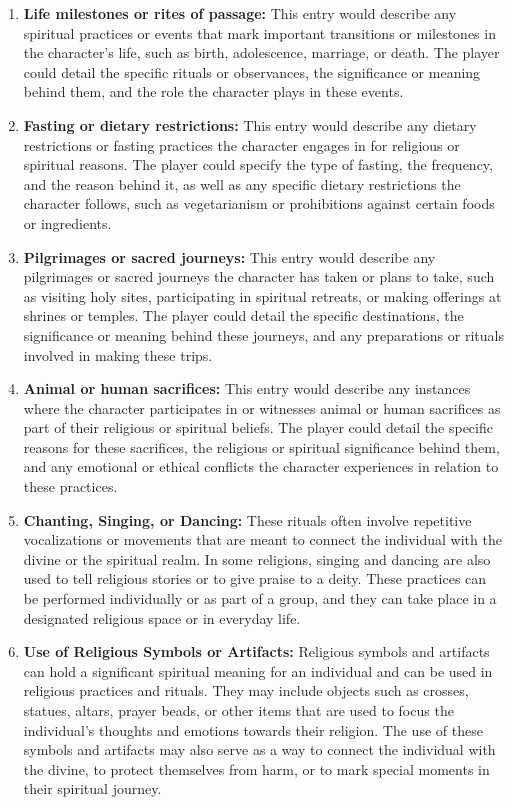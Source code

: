 \documentclass[12pt]{book}
\begin{document}
\begin{enumerate}
    \item \textbf{Life milestones or rites of passage:}
    This entry would describe any spiritual practices or events that mark important transitions or milestones in the character's life, such as birth, adolescence, marriage, or death. The player could detail the specific rituals or observances, the significance or meaning behind them, and the role the character plays in these events.

    \item \textbf{Fasting or dietary restrictions:}
    This entry would describe any dietary restrictions or fasting practices the character engages in for religious or spiritual reasons. The player could specify the type of fasting, the frequency, and the reason behind it, as well as any specific dietary restrictions the character follows, such as vegetarianism or prohibitions against certain foods or ingredients.
    
    \item \textbf{Pilgrimages or sacred journeys:}
    This entry would describe any pilgrimages or sacred journeys the character has taken or plans to take, such as visiting holy sites, participating in spiritual retreats, or making offerings at shrines or temples. The player could detail the specific destinations, the significance or meaning behind these journeys, and any preparations or rituals involved in making these trips.

    \item \textbf{Animal or human sacrifices:}
    This entry would describe any instances where the character participates in or witnesses animal or human sacrifices as part of their religious or spiritual beliefs. The player could detail the specific reasons for these sacrifices, the religious or spiritual significance behind them, and any emotional or ethical conflicts the character experiences in relation to these practices.

    \item \textbf{Chanting, Singing, or Dancing:}
    These rituals often involve repetitive vocalizations or movements that are meant to connect the individual with the divine or the spiritual realm. In some religions, singing and dancing are also used to tell religious stories or to give praise to a deity. These practices can be performed individually or as part of a group, and they can take place in a designated religious space or in everyday life.

    \item \textbf{Use of Religious Symbols or Artifacts:}
    Religious symbols and artifacts can hold a significant spiritual meaning for an individual and can be used in religious practices and rituals. They may include objects such as crosses, statues, altars, prayer beads, or other items that are used to focus the individual's thoughts and emotions towards their religion. The use of these symbols and artifacts may also serve as a way to connect the individual with the divine, to protect themselves from harm, or to mark special moments in their spiritual journey.
    

\end{enumerate}
\end{document}
